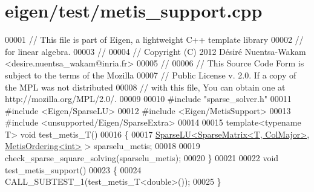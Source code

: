 \hypertarget{eigen_2test_2metis__support_8cpp_source}{}\section{eigen/test/metis\+\_\+support.cpp}
\label{eigen_2test_2metis__support_8cpp_source}

\begin{DoxyCode}
00001 \textcolor{comment}{// This file is part of Eigen, a lightweight C++ template library}
00002 \textcolor{comment}{// for linear algebra.}
00003 \textcolor{comment}{//}
00004 \textcolor{comment}{// Copyright (C) 2012 Désiré Nuentsa-Wakam <desire.nuentsa\_wakam@inria.fr>}
00005 \textcolor{comment}{//}
00006 \textcolor{comment}{// This Source Code Form is subject to the terms of the Mozilla}
00007 \textcolor{comment}{// Public License v. 2.0. If a copy of the MPL was not distributed}
00008 \textcolor{comment}{// with this file, You can obtain one at http://mozilla.org/MPL/2.0/.}
00009 
00010 \textcolor{preprocessor}{#include "sparse\_solver.h"}
00011 \textcolor{preprocessor}{#include <Eigen/SparseLU>}
00012 \textcolor{preprocessor}{#include <Eigen/MetisSupport>}
00013 \textcolor{preprocessor}{#include <unsupported/Eigen/SparseExtra>}
00014 
00015 \textcolor{keyword}{template}<\textcolor{keyword}{typename} T> \textcolor{keywordtype}{void} test\_metis\_T()
00016 \{
00017   \hyperlink{group___sparse_l_u___module_class_eigen_1_1_sparse_l_u}{SparseLU<SparseMatrix<T, ColMajor>}, 
      \hyperlink{class_eigen_1_1_metis_ordering}{MetisOrdering<int>} > sparselu\_metis;
00018   
00019   check\_sparse\_square\_solving(sparselu\_metis); 
00020 \}
00021 
00022 \textcolor{keywordtype}{void} test\_metis\_support()
00023 \{
00024   CALL\_SUBTEST\_1(test\_metis\_T<double>());
00025 \}
\end{DoxyCode}
